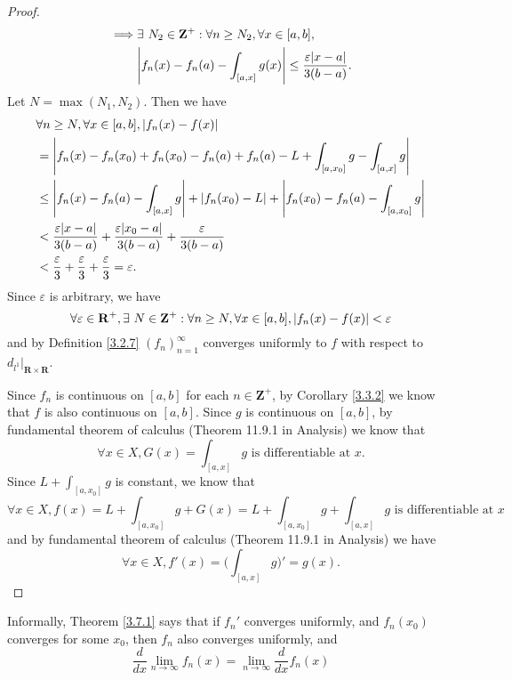 \begin{proof}
\begin{align*}
        \implies & \exists\ N_2 \in \mathbf{Z}^+ : \forall n \geq N_2, \forall x \in [a, b],                                                       \\
                 & \abs*{f_n(x) - f_n(a) - \int_{[a, x]} g(x)} \leq \frac{\varepsilon \abs*{x - a}}{3(b - a)}.
    \end{align*}
    Let \(N = \max(N_1, N_2)\).
    Then we have
    \begin{align*}
         & \forall n \geq N, \forall x \in [a, b], \abs*{f_n(x) - f(x)}                                                             \\
         & = \abs*{f_n(x) - f_n(x_0) + f_n(x_0) - f_n(a) + f_n(a) - L + \int_{[a, x_0]} g - \int_{[a, x]} g}                        \\
         & \leq \abs*{f_n(x) - f_n(a) - \int_{[a, x]} g} + \abs*{f_n(x_0) - L} + \abs*{f_n(x_0) - f_n(a) - \int_{[a, x_0]} g}       \\
         & < \frac{\varepsilon \abs*{x - a}}{3(b - a)} + \frac{\varepsilon \abs*{x_0 - a}}{3(b - a)} + \frac{\varepsilon}{3(b - a)} \\
         & < \frac{\varepsilon}{3} + \frac{\varepsilon}{3} + \frac{\varepsilon}{3} = \varepsilon.
    \end{align*}
    Since \(\varepsilon\) is arbitrary, we have
    \[
        \forall \varepsilon \in \mathbf{R}^+, \exists\ N \in \mathbf{Z}^+ : \forall n \geq N, \forall x \in [a, b], \abs*{f_n(x) - f(x)} < \varepsilon
    \]
    and by Definition \ref{3.2.7} \((f_n)_{n = 1}^\infty\) converges uniformly to \(f\) with respect to \(d_{l^1}|_{\mathbf{R} \times \mathbf{R}}\).

    Since \(f_n\) is continuous on \([a, b]\) for each \(n \in \mathbf{Z}^+\), by Corollary \ref{3.3.2} we know that \(f\) is also continuous on \([a, b]\).
    Since \(g\) is continuous on \([a, b]\), by fundamental theorem of calculus (Theorem 11.9.1 in Analysis) we know that
    \[
        \forall x \in X, G(x) = \int_{[a, x]} g \text{ is differentiable at } x.
    \]
    Since \(L + \int_{[a, x_0]} g\) is constant, we know that
    \[
        \forall x \in X, f(x) = L + \int_{[a, x_0]} g + G(x) = L + \int_{[a, x_0]} g + \int_{[a, x]} g \text{ is differentiable at } x
    \]
    and by fundamental theorem of calculus (Theorem 11.9.1 in Analysis) we have
    \[
        \forall x \in X, f'(x) = \bigg(\int_{[a, x]} g\bigg)' = g(x).
    \]
\end{proof}

\begin{note}
    Informally, Theorem \ref{3.7.1} says that if \(f_n'\) converges uniformly, and \(f_n(x_0)\) converges for some \(x_0\), then \(f_n\) also converges uniformly, and
    \[
        \frac{d}{dx} \lim_{n \to \infty} f_n(x) = \lim_{n \to \infty} \frac{d}{dx} f_n(x)
    \]
\end{note}

